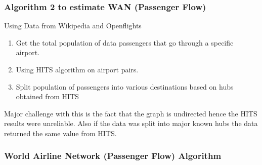\documentclass{beamer}
\begin{document}
\begin{frame}
\frametitle{Algorithm 2 to estimate WAN (Passenger Flow)}
Using Data from Wikipedia and Openflights
\begin{enumerate}
	\item Get the total population of data passengers that go through a specific airport.
	\item Using HITS algorithm on airport pairs.
	\item Split population of passengers into various destinations based on hubs obtained from HITS
\end{enumerate}
Major challenge with this is the fact that the graph is undirected hence the HITS results were unreliable. Also if the data was split into major known hubs the data returned the same value from HITS.
\end{frame}

\begin{frame}
\frametitle{World Airline Network (Passenger Flow)  Algorithm}
\end{frame}
\end{document}
